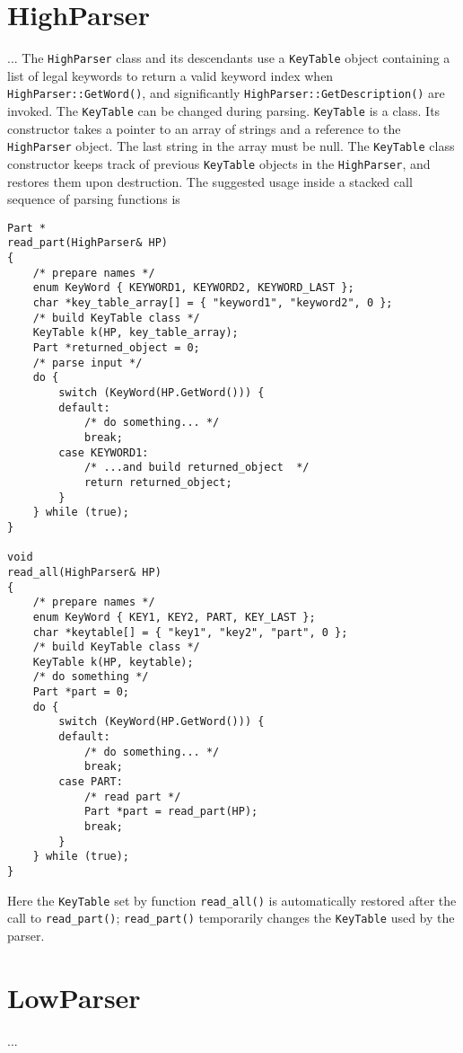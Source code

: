 \documentclass[10pt,dvips]{report}
\begin{document}
\section{HighParser} ... 
The \texttt{HighParser} class and its descendants use a \texttt{KeyTable}
object containing a list of legal keywords to return a valid keyword index
when \texttt{HighParser::GetWord()}, and significantly 
\texttt{HighParser::GetDescription()} are invoked.
The \texttt{KeyTable} can be changed during parsing.
\texttt{KeyTable} is a class.
Its constructor takes a pointer to an array of strings and a reference 
to the \texttt{HighParser} object.
The last string in the array must be null.
The \texttt{KeyTable} class constructor keeps track 
of previous \texttt{KeyTable} objects in the \texttt{HighParser}, 
and restores them upon destruction.
The suggested usage inside a stacked call sequence of parsing functions is
\begin{verbatim}
Part *
read_part(HighParser& HP)
{
    /* prepare names */
    enum KeyWord { KEYWORD1, KEYWORD2, KEYWORD_LAST };
    char *key_table_array[] = { "keyword1", "keyword2", 0 };
    /* build KeyTable class */
    KeyTable k(HP, key_table_array);
    Part *returned_object = 0;
    /* parse input */
    do {
        switch (KeyWord(HP.GetWord())) {
        default:
            /* do something... */
            break;
        case KEYWORD1:
            /* ...and build returned_object  */
            return returned_object;
        }
    } while (true);
}

void
read_all(HighParser& HP)
{
    /* prepare names */
    enum KeyWord { KEY1, KEY2, PART, KEY_LAST };
    char *keytable[] = { "key1", "key2", "part", 0 };
    /* build KeyTable class */
    KeyTable k(HP, keytable);
    /* do something */
    Part *part = 0;
    do {
        switch (KeyWord(HP.GetWord())) {
        default:
            /* do something... */
            break;
        case PART:
            /* read part */
            Part *part = read_part(HP);
            break;
        }
    } while (true);
}

\end{verbatim}
Here the \texttt{KeyTable} set by function \texttt{read\_all()} 
is automatically restored after the call to \texttt{read\_part()}; 
\texttt{read\_part()} temporarily changes the \texttt{KeyTable}
used by the parser.

\section{LowParser} ... 
\end{document}
